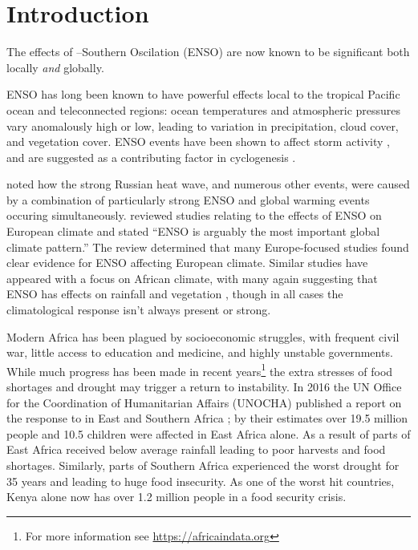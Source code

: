 \section{Introduction}

The effects of \elnino{}--Southern Oscilation (ENSO) are now known to be
significant both locally \emph{and} globally.

ENSO has long been known to have powerful effects local to the tropical Pacific
ocean and teleconnected regions: ocean temperatures and atmospheric pressures
vary anomalously high or low, leading to variation in precipitation, cloud
cover, and vegetation cover. ENSO events have been shown to affect storm
activity \citep{wang2002}, and are suggested as a contributing factor in
cyclogenesis \citep{sobel2000}.

\cite{trenberth2012} noted how the strong Russian heat wave, and numerous
other events, were caused by a combination of particularly strong ENSO and
global warming events occuring simultaneously. \cite{bronnimann2007} reviewed
studies relating to the effects of ENSO on European climate and stated ``ENSO is
arguably the most important global climate pattern.'' The review determined that
many Europe-focused studies found clear evidence for ENSO affecting European
climate. Similar studies have appeared with a focus on African climate, with
many again suggesting that ENSO has effects on rainfall \citep{kane2009} and
vegetation \citep{anyamba1996, anyamba2001, anyamba2002}, though in all cases
the climatological response isn't always present or strong.

\vspace{0.5cm}

Modern Africa has been plagued by socioeconomic struggles, with frequent civil
war, little access to education and medicine, and highly unstable
governments. While much progress has been made in recent years\footnote{For more
  information see \url{https://africaindata.org}} the extra stresses of food
shortages and drought may trigger a return to instability.
In 2016 the UN Office for the Coordination of Humanitarian Affairs (UNOCHA)
published a report on the response to \elnino{} in East and Southern Africa
\citep{unocha2016}; by their estimates over 19.5 million people and 10.5
children were affected in East Africa alone. As a result of \elnino{} parts of
East Africa received below average rainfall leading to poor harvests and food
shortages. Similarly, parts of Southern Africa experienced the worst drought for
35 years and leading to huge food insecurity. As one of the worst hit countries,
Kenya alone now has over 1.2 million people in a food security crisis.

